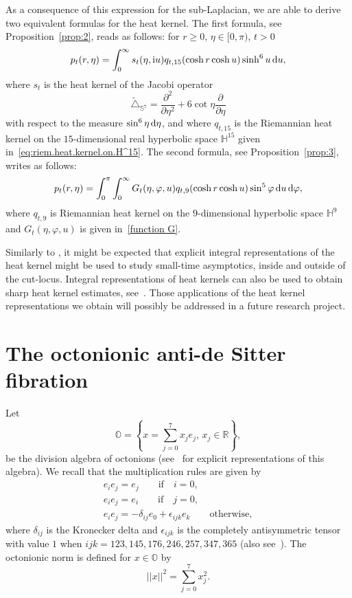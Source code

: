 \documentclass[pdftex]{sigma}
\numberwithin{equation}{section}
\begin{document}
As a consequence of this expression for the sub-Laplacian, we are able to derive two equivalent formulas for the heat kernel. The first formula, see Proposition~\ref{prop:2}, reads as follows: for $r\geq 0$, $\eta\in [0,\pi)$, $t>0$
\begin{align*}
p_t(r,\eta)=\int_{0}^{\infty} s_t(\eta , {\rm i}u) q_{t,15}(\cosh r \cosh u) \sinh^6u \, {\rm d}u,
\end{align*}
where $s_t$ is the heat kernel of the Jacobi operator
\begin{equation*}
\tilde{\triangle}_{\mathbb{S}^7}=\frac{{\partial}^2}{\partial {\eta}^2}+6\cot \eta\frac{{\partial}}{\partial {\eta}}
\end{equation*}
with respect to the measure $\sin^6\eta \, {\rm d}\eta$, and where $q_{t,15}$ is the Riemannian heat kernel on the $15$-dimensional real hyperbolic space $\mathbb{H}^{15}$ given in~\eqref{eq:riem.heat.kernel.on.H^15}.
The second formula, see Proposition~\ref{prop:3}, writes as follows:
\begin{gather*}
p_t(r,\eta)= \int_0^\pi \int_{0}^{\infty} G_t(\eta, \varphi, u) q_{t,9}(\cosh r \cosh u) \sin^5 \varphi \, {\rm d}u \, {\rm d} \varphi ,
\end{gather*}
where $q_{t,9}$ is Riemannian heat kernel on the $9$-dimensional hyperbolic space $\mathbb{H}^{9}$ and $G_t(\eta, \varphi, u)$ is given in~\eqref{function G}.

Similarly to \cite{FBND18,FBJW18,JW16}, it might be expected that explicit integral representations of the heat kernel might be used to study small-time asymptotics, inside and outside of the cut-locus. Integral representations of heat kernels can also be used to obtain sharp heat kernel estimates, see~\cite{MR2541147}. Those applications of the heat kernel representations we obtain will possibly be addressed in a future research project.

\section{The octonionic anti-de Sitter fibration}\label{section2}

Let
\begin{equation*}
\mathbb{O}=\left\{x=\sum_{j=0}^{7}x_j e_j,\, x_j\in \mathbb{R} \right\},
\end{equation*}
be the division algebra of octonions (see~\cite{MR1803808} for explicit representations of this algebra). We recall that the multiplication rules are given by
\begin{gather*}
e_i e_j=e_j \qquad \text{if} \quad i=0,
\\
e_i e_j=e_i \qquad \text{if} \quad j=0,
\\
e_i e_j=-\delta_{ij}e_0+\epsilon_{ijk}e_k \qquad \text{otherwise},
\end{gather*}
where $\delta_{ij}$ is the Kronecker delta and $\epsilon_{ijk}$ is the completely antisymmetric tensor with value $1$ when $ijk = 123, 145, 176, 246, 257, 347, 365$ (also see~\cite{FBGC19}).
The octonionic norm is defined for $x \in \mathbb{O}$ by
\begin{equation*}
||x||^2=\sum_{j=0}^{7}x^2_j.
\end{equation*}
\end{document}
